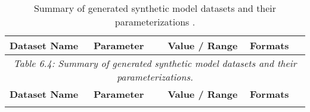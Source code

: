 \begin{longtable}{@{}llll@{}}
\caption[Summary of generated synthetic model datasets and their parameterizations.]{Summary of generated synthetic model datasets and their parameterizations \cite{aras_synthetic_2025}.}
\label{tab:syn_datasets_overview}\\
\toprule
\textbf{Dataset Name} & \textbf{Parameter} & \textbf{Value / Range} & \textbf{Formats} \\* \midrule
\endfirsthead
\multicolumn{4}{c}{\textit{Table 6.4: Summary of generated synthetic model datasets and their parameterizations.}}\\
\toprule
\textbf{Dataset Name} & \textbf{Parameter} & \textbf{Value / Range} & \textbf{Formats} \\* \midrule
\endhead
%
\bottomrule
\endfoot
%
\endlastfoot


\end{longtable}
